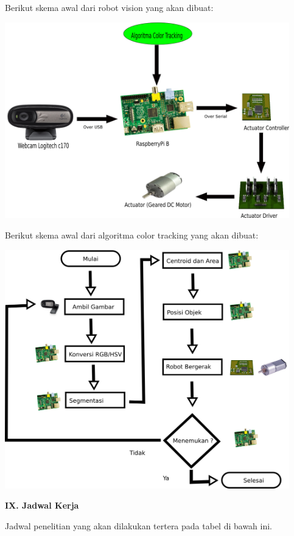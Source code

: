 \documentclass[a4paper,12pt]{article}
\begin{document}
Berikut skema awal dari robot vision yang akan dibuat:

\begin{center}
 \includegraphics[width=350pt]{desain_awal}
\end{center}

Berikut skema awal dari algoritma color tracking yang akan dibuat:

\begin{center}
 \includegraphics[width=350pt]{process}
\end{center}

\newpage
\noindent \textbf{IX. \hspace{9pt} Jadwal Kerja}

Jadwal penelitian yang akan dilakukan tertera pada tabel di bawah ini.
\end{document}
